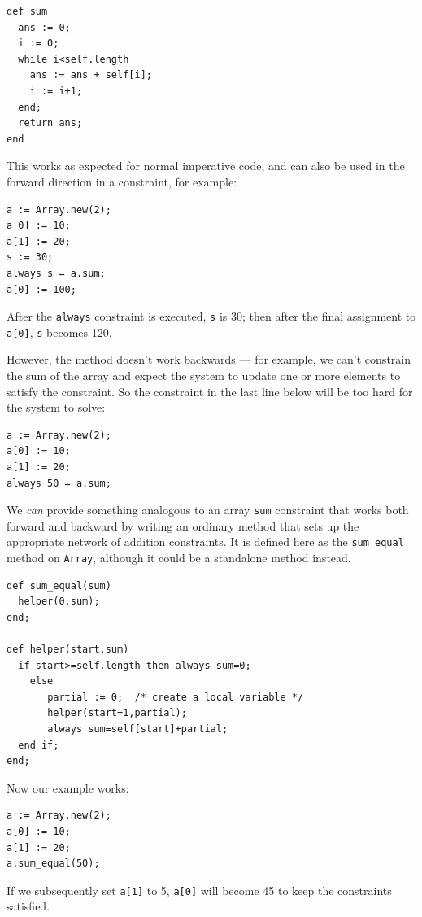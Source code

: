 \documentclass{article}
\begin{document}
\begin{verbatim}
def sum
  ans := 0;
  i := 0;
  while i<self.length
    ans := ans + self[i];
    i := i+1;
  end;
  return ans;
end
\end{verbatim}

This works as expected for normal imperative code, and can also be
used in the forward direction in a constraint, for example:

\begin{verbatim}
a := Array.new(2);
a[0] := 10;
a[1] := 20;
s := 30;
always s = a.sum;
a[0] := 100;
\end{verbatim}

After the \verb|always| constraint is executed, \verb|s| is 30; then
after the final assignment to \verb|a[0]|, \verb|s| becomes 120.

However, the method doesn't work backwards --- for example, we can't
constrain the sum of the array and expect the system to update one or
more elements to satisfy the constraint.  So the constraint in the
last line below will be too hard for the system to solve:

\begin{verbatim}
a := Array.new(2);
a[0] := 10;
a[1] := 20;
always 50 = a.sum;
\end{verbatim}

We \emph{can} provide something analogous to an array \verb|sum|
constraint that works both forward and backward by writing an ordinary
method that sets up the appropriate network of addition constraints.
It is defined here as the \verb|sum_equal| method on \verb|Array|,
although it could be a standalone method instead.

\begin{verbatim}
def sum_equal(sum)
  helper(0,sum);
end;

def helper(start,sum)
  if start>=self.length then always sum=0;
    else 
       partial := 0;  /* create a local variable */
       helper(start+1,partial);
       always sum=self[start]+partial;
  end if;
end;  
\end{verbatim}

Now our example works:

\begin{verbatim}
a := Array.new(2);
a[0] := 10;
a[1] := 20;
a.sum_equal(50);
\end{verbatim}

If we subsequently set \verb|a[1]| to 5, \verb|a[0]| will become 45 to
keep the constraints satisfied.
\end{document}
